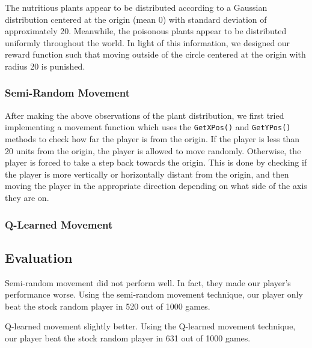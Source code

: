 \documentclass[solution, letterpaper]{cs121}
\begin{document}
The nutritious plants appear to be distributed according to a Gaussian distribution centered at the origin (mean 0) with standard deviation of approximately 20. Meanwhile, the poisonous plants appear to be distributed uniformly throughout the world. In light of this information, we designed our reward function such that moving outside of the circle centered at the origin with radius 20 is punished.

\subsubsection{Semi-Random Movement}
After making the above observations of the plant distribution, we first tried implementing a movement function which uses the {\tt GetXPos()} and {\tt GetYPos()} methods to check how far the player is from the origin. If the player is less than 20 units from the origin, the player is allowed to move randomly. Otherwise, the player is forced to take a step back towards the origin. This is done by checking if the player is more vertically or horizontally distant from the origin, and then moving the player in the appropriate direction depending on what side of the axis they are on.

\subsubsection{Q-Learned Movement}
\subsection{Evaluation}
Semi-random movement did not perform well. In fact, they made our player's performance worse. Using the semi-random movement technique, our player only beat the stock random player in 520 out of 1000 games.

Q-learned movement slightly better. Using the Q-learned movement technique, our player beat the stock random player in 631 out of 1000 games.
\end{document}
